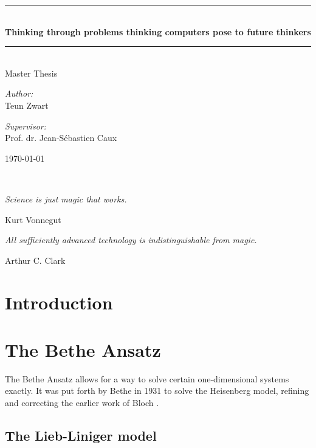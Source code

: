\documentclass[11pt, a4paper,draft]{report} %
\newcommand\TITLE{Thinking through problems thinking computers pose to future thinkers}
\newcommand\THESISFORM{Master Thesis}
\newcommand\AUTHOR{Teun Zwart}
\newcommand\SUPERVISOR{Prof. dr. Jean-Sébastien Caux}
\newcommand\UNIVERSITYLOGO{} %
\begin{document}
\begin{titlepage}
	\begin{center}
		\rule{\textwidth}{0.4mm}\\[0.5cm]
		\huge{\textbf{\TITLE}}
		\rule{\textwidth}{0.4mm}\\[0.5cm]
		\Large{\THESISFORM}\\[0.5cm]
		\begin{minipage}[t]{0.4\textwidth}
			\begin{flushleft}
				\large\emph{Author:}\\{\AUTHOR}
			\end{flushleft}
		\end{minipage}
		\begin{minipage}[t]{0.4\textwidth}
			\begin{flushright}
				\large\emph{Supervisor:}\\{\SUPERVISOR}
			\end{flushright}
		\end{minipage}
		\vfill
		\large \today\\
	\end{center}
\end{titlepage}

\newpage
\thispagestyle{empty}

\ 
\vspace{4cm}

\epigraph{\itshape Science is just magic that works.}{Kurt Vonnegut}

\epigraph{\itshape All sufficiently advanced technology is indistinguishable from magic.}{Arthur C. Clark}


\tableofcontents

\chapter{Introduction}

\chapter{The Bethe Ansatz}

The Bethe Ansatz allows for a way to solve certain one-dimensional systems exactly.
It was put forth by Bethe in 1931 to solve the Heisenberg model, refining and correcting the earlier work of Bloch \cite{Bethe1931}.

\section{The Lieb-Liniger model}
\end{document}
